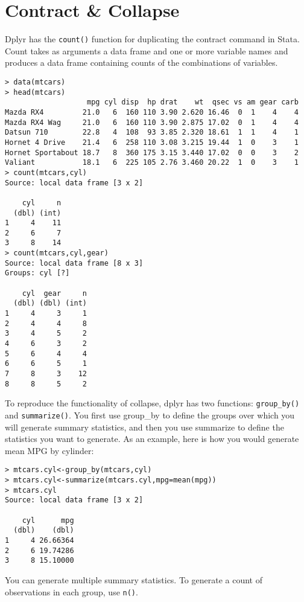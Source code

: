 \documentclass[12pt, oneside]{amsart}   	%
\begin{document}
\section{Contract \& Collapse}

Dplyr has the \texttt{count()} function for duplicating the contract command in Stata. Count takes as arguments a data frame and one or more variable names and produces a data frame containing counts of the combinations of variables. 

\begin{verbatim}
> data(mtcars)
> head(mtcars)
                   mpg cyl disp  hp drat    wt  qsec vs am gear carb
Mazda RX4         21.0   6  160 110 3.90 2.620 16.46  0  1    4    4
Mazda RX4 Wag     21.0   6  160 110 3.90 2.875 17.02  0  1    4    4
Datsun 710        22.8   4  108  93 3.85 2.320 18.61  1  1    4    1
Hornet 4 Drive    21.4   6  258 110 3.08 3.215 19.44  1  0    3    1
Hornet Sportabout 18.7   8  360 175 3.15 3.440 17.02  0  0    3    2
Valiant           18.1   6  225 105 2.76 3.460 20.22  1  0    3    1
> count(mtcars,cyl)
Source: local data frame [3 x 2]

    cyl     n
  (dbl) (int)
1     4    11
2     6     7
3     8    14
> count(mtcars,cyl,gear)
Source: local data frame [8 x 3]
Groups: cyl [?]

    cyl  gear     n
  (dbl) (dbl) (int)
1     4     3     1
2     4     4     8
3     4     5     2
4     6     3     2
5     6     4     4
6     6     5     1
7     8     3    12
8     8     5     2
\end{verbatim}

To reproduce the functionality of collapse, dplyr has two functions: \texttt{group\_by()} and \texttt{summarize()}. You first use group\_by to define the groups over which you will generate summary statistics, and then you use summarize to define the statistics you want to generate. As an example, here is how you would generate mean MPG by cylinder:

\begin{verbatim}
> mtcars.cyl<-group_by(mtcars,cyl)
> mtcars.cyl<-summarize(mtcars.cyl,mpg=mean(mpg))
> mtcars.cyl
Source: local data frame [3 x 2]

    cyl      mpg
  (dbl)    (dbl)
1     4 26.66364
2     6 19.74286
3     8 15.10000
\end{verbatim}

You can generate multiple summary statistics. To generate a count of observations in each group, use \texttt{n()}.
\end{document}
